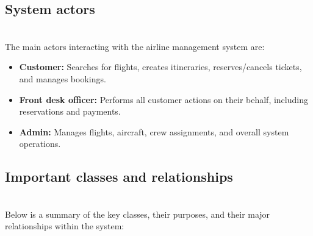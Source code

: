 \subsection{System actors}\label{zIhrpXAWnCqh6C9NSFUxw}
\\
The main actors interacting with the airline management system are:

\begin{itemize}
\item
\protect{}\label{5gDQ6u-1p_Y9H3BL37IG4}
\textbf{Customer:} Searches for flights, creates itineraries, reserves/cancels tickets, and manages bookings.
\item
\protect{}\label{-jcZPLCZ2rVsRXDMaNBun}
\textbf{Front desk officer:} Performs all customer actions on their behalf, including reservations and payments.
\item
\protect{}\label{tSMPRAydPIcxYPIUHcnl7}
\textbf{Admin:} Manages flights, aircraft, crew assignments, and overall system operations.
\end{itemize}

\subsection{Important classes and relationships}\label{yoH60YDrbUMPbvrPwfZdk}
\\
Below is a summary of the key classes, their purposes, and their major relationships within the system:

